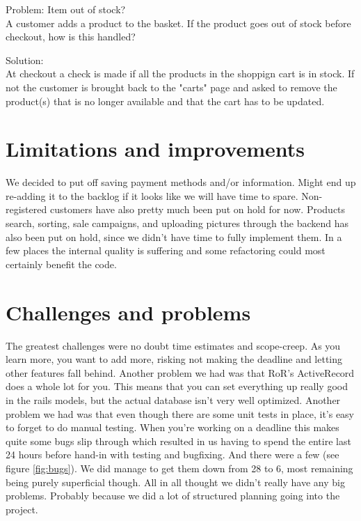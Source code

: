 \documentclass[paper=a4, fontsize=11pt]{report} %
\begin{document}
	Problem: Item out of stock? \\
		A customer adds a product to the basket. If the product goes out of
		stock before checkout, how is this handled?

	Solution: \\
		At checkout a check is made if all the products in the shoppign cart 
        is in stock. If not the customer is brought back to the "carts" page 
        and asked to remove the product(s) that is no longer available and
        that the cart has to be updated.

\section*{Limitations and improvements}

	We decided to put off saving payment methods and/or information. Might
	end up re-adding it to the backlog if it looks like we will have time
	to spare. Non-registered customers have also pretty much been put on hold for now.
	Products search, sorting, sale campaigns, and uploading pictures
	through the backend has also been put on hold, since we didn't have
	time to fully implement them. In a few places the internal quality is suffering and
	some refactoring could most certainly benefit the code.

\section*{Challenges and problems}

	The greatest challenges were no doubt time estimates and scope-creep. As you learn more, you want to add more, risking not making the deadline and letting other features fall behind. Another problem we had was that RoR's ActiveRecord does a whole lot for you. This means that you can set everything up really good in the rails models, but the actual database isn't very well optimized.
	Another problem we had was that even though there are some unit tests in place, it's easy to forget to do manual testing. When you're working on a deadline this makes quite some bugs slip through which resulted in us having to spend the entire last 24 hours before hand-in with testing and bugfixing. And there were a few (see figure \ref{fig:bugs}). We did manage to get them down from 28 to 6, most remaining being purely superficial though.
	All in all thought we didn't really have any big problems. Probably because  we did a lot of structured planning going into the project.
\end{document}

